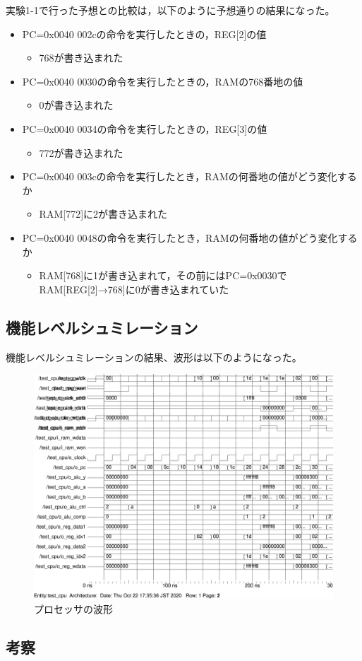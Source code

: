 実験1-1で行った予想との比較は，以下のように予想通りの結果になった。
\begin{itemize}
  \item PC=0x0040 002cの命令を実行したときの，REG[2]の値
  \begin{itemize}
    \item 768が書き込まれた
  \end{itemize}
  \item PC=0x0040 0030の命令を実行したときの，RAMの768番地の値
  \begin{itemize}
    \item 0が書き込まれた
  \end{itemize}
  \item PC=0x0040 0034の命令を実行したときの，REG[3]の値
  \begin{itemize}
    \item 772が書き込まれた
  \end{itemize}
  \item PC=0x0040 003cの命令を実行したとき，RAMの何番地の値がどう変化するか
  \begin{itemize}
    \item RAM[772]に2が書き込まれた
  \end{itemize}
  \item PC=0x0040 0048の命令を実行したとき，RAMの何番地の値がどう変化するか
  \begin{itemize}
    \item RAM[768]に1が書き込まれて，その前にはPC=0x0030でRAM[REG[2]→768]に0が書き込まれていた
  \end{itemize}
\end{itemize}

\subsection{機能レベルシュミレーション}
機能レベルシュミレーションの結果、波形は以下のようになった。
\begin{figure}[H]
  \centering
  \includegraphics[width=\linewidth]{./src/01/testCPUwave.png}
  \caption{プロセッサの波形}
\end{figure}

\subsection{考察}
